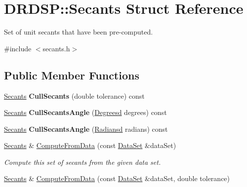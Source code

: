 \hypertarget{struct_d_r_d_s_p_1_1_secants}{\section{D\-R\-D\-S\-P\-:\-:Secants Struct Reference}
\label{struct_d_r_d_s_p_1_1_secants}
}


Set of unit secants that have been pre-\/computed.  




{\ttfamily \#include $<$secants.\-h$>$}

\subsection*{Public Member Functions}
\begin{DoxyCompactItemize}
\item 
\hypertarget{struct_d_r_d_s_p_1_1_secants_a43e1c7b34ac0ed5b971cb65dc215e6fb}{\hyperlink{struct_d_r_d_s_p_1_1_secants}{Secants} {\bfseries Cull\-Secants} (double tolerance) const }\label{struct_d_r_d_s_p_1_1_secants_a43e1c7b34ac0ed5b971cb65dc215e6fb}

\item 
\hypertarget{struct_d_r_d_s_p_1_1_secants_acbaf3dce9ddfb23d80ff093e629d4275}{\hyperlink{struct_d_r_d_s_p_1_1_secants}{Secants} {\bfseries Cull\-Secants\-Angle} (\hyperlink{struct_d_r_d_s_p_1_1_degrees}{Degreesd} degrees) const }\label{struct_d_r_d_s_p_1_1_secants_acbaf3dce9ddfb23d80ff093e629d4275}

\item 
\hypertarget{struct_d_r_d_s_p_1_1_secants_ac6f3d0d30aab4cc28ee2ebc81c6e9a7d}{\hyperlink{struct_d_r_d_s_p_1_1_secants}{Secants} {\bfseries Cull\-Secants\-Angle} (\hyperlink{struct_d_r_d_s_p_1_1_radians}{Radiansd} radians) const }\label{struct_d_r_d_s_p_1_1_secants_ac6f3d0d30aab4cc28ee2ebc81c6e9a7d}

\item 
\hypertarget{struct_d_r_d_s_p_1_1_secants_a0863c97dcf80e86c5f7d941bb91ed68e}{\hyperlink{struct_d_r_d_s_p_1_1_secants}{Secants} \& \hyperlink{struct_d_r_d_s_p_1_1_secants_a0863c97dcf80e86c5f7d941bb91ed68e}{Compute\-From\-Data} (const \hyperlink{struct_d_r_d_s_p_1_1_data_set}{Data\-Set} \&data\-Set)}\label{struct_d_r_d_s_p_1_1_secants_a0863c97dcf80e86c5f7d941bb91ed68e}

\begin{DoxyCompactList}\small\item\em Compute this set of secants from the given data set. \end{DoxyCompactList}\item 
\hypertarget{struct_d_r_d_s_p_1_1_secants_ab0d7e98f7ba8474af04b722faf05870a}{\hyperlink{struct_d_r_d_s_p_1_1_secants}{Secants} \& \hyperlink{struct_d_r_d_s_p_1_1_secants_ab0d7e98f7ba8474af04b722faf05870a}{Compute\-From\-Data} (const \hyperlink{struct_d_r_d_s_p_1_1_data_set}{Data\-Set} \&data\-Set, double tolerance)}\label{struct_d_r_d_s_p_1_1_secants_ab0d7e98f7ba8474af04b722faf05870a}


\end{DoxyCompactItemize}
